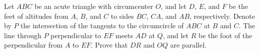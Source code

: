 Let $ABC$ be an acute triangle with circumcenter $O$, and let $D$, $E$, and $F$ be the feet of altitudes from $A$, $B$, and $C$ to sides $BC$, $CA$, and $AB$, respectively. Denote by $P$ the intersection of the tangents to the circumcircle of $ABC$ at $B$ and $C$. The line through $P$ perpendicular to $EF$ meets $AD$ at $Q$, and let $R$ be the foot of the perpendicular from $A$ to $EF$. Prove that $DR$ and $OQ$ are parallel.